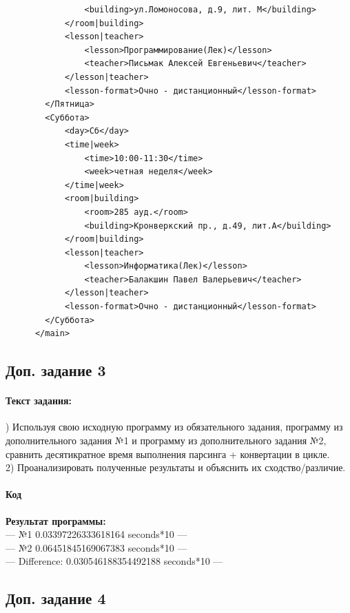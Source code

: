 \documentclass[12pt,onecolumn]{article}
\begin{document}
\begin{flushleft}
\begin{verbatim}
                <building>ул.Ломоносова, д.9, лит. М</building>
            </room|building>
            <lesson|teacher>
                <lesson>Программирование(Лек)</lesson>
                <teacher>Письмак Алексей Евгеньевич</teacher>
            </lesson|teacher>
            <lesson-format>Очно - дистанционный</lesson-format>
        </Пятница>
        <Суббота>
            <day>Сб</day>
            <time|week>
                <time>10:00-11:30</time>
                <week>четная неделя</week>
            </time|week>
            <room|building>
                <room>285 ауд.</room>
                <building>Кронверкский пр., д.49, лит.А</building>
            </room|building>
            <lesson|teacher>
                <lesson>Информатика(Лек)</lesson>
                <teacher>Балакшин Павел Валерьевич</teacher>
            </lesson|teacher>
            <lesson-format>Очно - дистанционный</lesson-format>
        </Суббота>
      </main>
    \end{verbatim}  
\endgroup
\subsection{Доп. задание 3}
\paragraph{Текст задания:}
\hfill {}) Используя свою исходную программу из обязательного задания, программу из дополнительного задания №1 и программу из дополнительного задания №2, сравнить десятикратное время выполнения парсинга + конвертации в цикле.\\
2) Проанализировать полученные результаты и объяснить их сходство/различие.\\
\paragraph{Код}
\hfill \break
\FloatBarrier

\hfill \break
\textbf{Результат программы:}\\
--- №1 0.03397226333618164 seconds*10 ---\\
--- №2 0.06451845169067383 seconds*10 ---\\
--- Difference: 0.030546188354492188 seconds*10 ---\\
\subsection{Доп. задание 4}

\end{flushleft}
\end{document}
